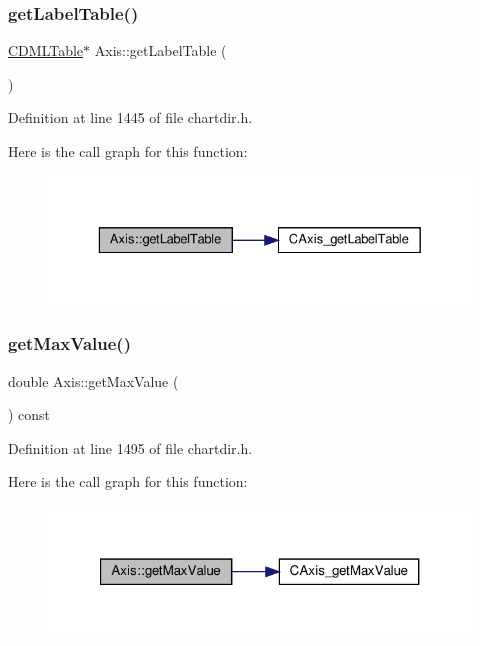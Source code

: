 \subsubsection{\texorpdfstring{get\+Label\+Table()}{getLabelTable()}}
{\footnotesize\ttfamily \hyperlink{class_c_d_m_l_table}{C\+D\+M\+L\+Table}$\ast$ Axis\+::get\+Label\+Table (\begin{DoxyParamCaption}{ }\end{DoxyParamCaption})\hspace{0.3cm}{\ttfamily [inline]}}



Definition at line 1445 of file chartdir.\+h.

Here is the call graph for this function\+:
\nopagebreak
\begin{figure}[H]
\begin{center}
\leavevmode
\includegraphics[width=329pt]{class_axis_a5c187793e791bd6e5ce8ee1f63a114e8_cgraph}
\end{center}
\end{figure}
\mbox{\label{class_axis_a0712caf5b1b2dc5349c4ad4e95ba63cc}} 
\subsubsection{\texorpdfstring{get\+Max\+Value()}{getMaxValue()}}
{\footnotesize\ttfamily double Axis\+::get\+Max\+Value (\begin{DoxyParamCaption}{ }\end{DoxyParamCaption}) const\hspace{0.3cm}{\ttfamily [inline]}}



Definition at line 1495 of file chartdir.\+h.

Here is the call graph for this function\+:
\nopagebreak
\begin{figure}[H]
\begin{center}
\leavevmode
\includegraphics[width=321pt]{class_axis_a0712caf5b1b2dc5349c4ad4e95ba63cc_cgraph}
\end{center}
\end{figure}
\mbox{\label{class_axis_a2a1c7c42965a0689314845e17ac8606d}} 

